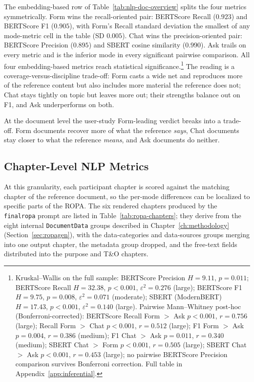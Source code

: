 The embedding-based row of Table~\ref{tab:nlp-doc-overview} splits
the four metrics symmetrically. Form wins the recall-oriented
pair: BERTScore Recall ($0.923$) and BERTScore F1 ($0.905$), with
Form's Recall standard deviation the smallest of any mode-metric
cell in the table (SD $0.005$). Chat wins the precision-oriented
pair: BERTScore Precision ($0.895$) and SBERT cosine similarity
($0.990$). Ask trails on every metric and is the inferior mode in every
significant pairwise comparison. All four embedding-based metrics
reach statistical significance.\footnote{Kruskal--Wallis on the
full sample: BERTScore Precision $H = 9.11$, $p = 0.011$;
BERTScore Recall $H = 32.38$, $p < 0.001$, $\varepsilon^2 =
0.276$ (large); BERTScore F1 $H = 9.75$, $p = 0.008$,
$\varepsilon^2 = 0.071$ (moderate); SBERT (ModernBERT) $H =
17.43$, $p < 0.001$, $\varepsilon^2 = 0.140$ (large). Pairwise
Mann--Whitney post-hoc (Bonferroni-corrected): BERTScore Recall
Form $>$ Ask $p < 0.001$, $r = 0.756$ (large); Recall Form $>$
Chat $p < 0.001$, $r = 0.512$ (large); F1 Form $>$ Ask $p =
0.004$, $r = 0.386$ (medium); F1 Chat $>$ Ask $p = 0.011$, $r =
0.340$ (medium); SBERT Chat $>$ Form $p < 0.001$, $r = 0.505$
(large); SBERT Chat $>$ Ask $p < 0.001$, $r = 0.453$ (large); no
pairwise BERTScore Precision comparison survives Bonferroni
correction. Full table in Appendix~\ref{app:inferential}.}
The reading is a coverage-versus-discipline trade-off: Form casts
a wide net and reproduces more of the reference content but also
includes more material the reference does not; Chat stays tightly
on topic but leaves more out; their strengths balance out on F1,
and Ask underperforms on both.

At the document level the user-study Form-leading verdict breaks
into a trade-off. Form documents recover more of what the
reference \emph{says}, Chat documents stay closer to what the
reference \emph{means}, and Ask documents do neither.

\subsection{Chapter-Level NLP Metrics}
\label{sec:eval-nlp-chapter}

At this granularity, each participant chapter is scored against
the matching chapter of the reference document, so the per-mode
differences can be localized to specific parts of the ROPA. The
six rendered chapters produced by the \texttt{finalropa} prompt
are listed in Table~\ref{tab:ropa-chapters}; they derive from the
eight internal \texttt{DocumentData} groups described in
Chapter~\ref{ch:methodology}
(Section~\ref{sec:ropagen}), with the data-categories and
data-sources groups merging into one output chapter, the metadata
group dropped, and the free-text fields distributed into the
purpose and T\&O chapters.

